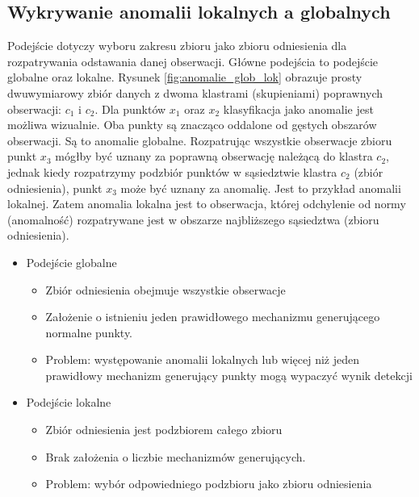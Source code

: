 \subsection{Wykrywanie anomalii lokalnych a globalnych}
\label{sub:loc_glob}
Podejście dotyczy wyboru zakresu zbioru jako zbioru odniesienia dla rozpatrywania odstawania danej obserwacji. Główne podejścia to podejście globalne oraz lokalne. Rysunek \ref{fig:anomalie_glob_lok} obrazuje prosty dwuwymiarowy zbiór danych z dwoma klastrami (skupieniami) poprawnych obserwacji: $c_1$ i $c_2$. Dla punktów $x_1 $ oraz $x_2$ klasyfikacja jako anomalie jest możliwa wizualnie. Oba punkty są znacząco oddalone od gęstych obszarów obserwacji. Są to anomalie globalne. Rozpatrując wszystkie obserwacje zbioru punkt $x_3$ mógłby być uznany za poprawną obserwację należącą do klastra $c_2$, jednak kiedy rozpatrzymy podzbiór punktów w sąsiedztwie klastra $c_2$ (zbiór odniesienia), punkt $x_3$ może być uznany za anomalię. Jest to przykład anomalii lokalnej. Zatem anomalia lokalna jest to obserwacja, której odchylenie od normy (anomalność) rozpatrywane jest w obszarze najbliższego sąsiedztwa (zbioru odniesienia). 
\begin{itemize}
    \item Podejście globalne 
    \begin{itemize}
        \item Zbiór odniesienia obejmuje wszystkie obserwacje
        \item Założenie o istnieniu jeden prawidłowego mechanizmu generującego normalne punkty.
        \item Problem: występowanie anomalii lokalnych lub więcej niż jeden prawidłowy mechanizm generujący punkty mogą wypaczyć wynik detekcji
    \end{itemize}
    \item Podejście lokalne 
    \begin{itemize}
        \item Zbiór odniesienia jest podzbiorem całego zbioru
        \item Brak założenia o liczbie mechanizmów generujących.
        \item Problem: wybór odpowiedniego podzbioru jako zbioru odniesienia
    \end{itemize}
\end{itemize}

